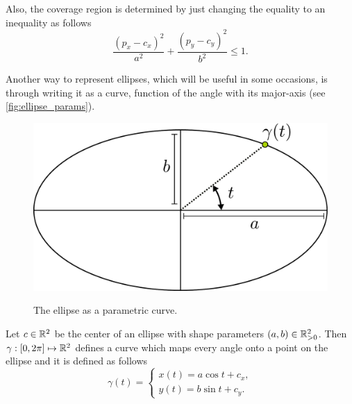 Also, the coverage region is determined by just changing the equality to an inequality as follows
\begin{equation}\label{equation:cover_pellipse}
\frac{(p_x-c_x)^2}{a^2} + \frac{(p_y-c_y)^2}{b^2} \le 1.
\end{equation}

Another way to represent ellipses, which will be useful in some occasions, is through writing it as a curve, function of the angle with its major-axis (see \autoref{fig:ellipse_params}).

\begin{figure}[H]
    \centering
    
    \caption{The ellipse as a parametric curve.}
%    
   	\includegraphics[scale=.4]{tex/figures/ellipse_definition.pdf}
    \fautor
    \label{fig:ellipse_params}
\end{figure}

Let $c \in \mathbb{R}^2$ be the center of an ellipse with shape parameters $(a,b) \in \mathbb{R}^2_{>0}$. Then $\gamma : [0, 2\pi] \mapsto \mathbb{R}^2$ defines a curve which maps every angle onto a point on the ellipse and it is defined as follows
\begin{equation}\label{eq:parametric_ellipse}
\gamma(t) = \left\{
\begin{array}{l}
x(t)= a\cos{t} + c_x,\\
y(t)=b\sin{t} + c_y.
\end{array}
\right.
\end{equation}

